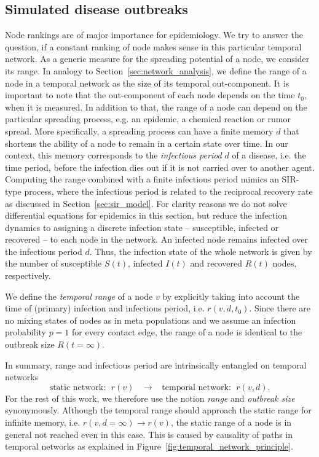 \subsection{Simulated disease outbreaks}
Node rankings are of major importance for epidemiology.
We try to answer the question, if a constant ranking of node makes sense in this particular temporal network.
As a generic measure for the spreading potential of a node, we consider its range.
In analogy to Section~\ref{sec:network_analysis}, we define the range of a node in a temporal network as the size of its temporal out-component.
It is important to note that the out-component of each node depends on the time $t_0$, when it is measured.
In addition to that, the range of a node can depend on the particular spreading process, e.g. an epidemic, a chemical reaction or rumor spread.
More specifically, a spreading process can have a finite memory $d$ that shortens the ability of a node to remain in a certain state over time.
In our context, this memory corresponds to the \emph{infectious period} $d$ of a disease, i.e. the time period, before the infection dies out if it is not carried over to another agent.
Computing the range combined with a finite infectious period mimics an SIR-type process, where the infectious period is related to the reciprocal recovery rate as discussed in Section~\ref{sec:sir_model}.
For clarity reasons we do not solve differential equations for epidemics in this section, but reduce the infection dynamics to assigning a discrete infection state -- susceptible, infected or recovered -- to each node in the network.
An infected node remains infected over the infectious period $d$.
Thus, the infection state of the whole network is given by the number of susceptible $S(t)$, infected $I(t)$ and recovered $R(t)$ nodes, respectively.

We define the \emph{temporal range} of a node $v$ by explicitly taking into account the time of (primary) infection and infectious period, i.e. $r(v,d,t_0)$.
Since there are no mixing states of nodes as in meta populations and we assume an infection probability $p=1$ for every contact edge, the range of a node is identical to the outbreak size $R(t=\infty )$. 

In summary, range and infectious period are intrinsically entangled on temporal networks
\begin{equation}\label{eq:range_and_inf_period}
\text{static network: } \; r(v) \;\;\; \rightarrow   \;\;\; \text{temporal network: } \; r(v,d) .
\end{equation}
For the rest of this work, we therefore use the notion \emph{range} and \emph{outbreak size} synonymously.
Although the temporal range should approach the static range for infinite memory, i.e. $r(v,d=\infty ) \rightarrow r(v)$, the static range of a node is in general not reached even in this case.
This is caused by causality of paths in temporal networks as explained in Figure~\ref{fig:temporal_network_principle}.

